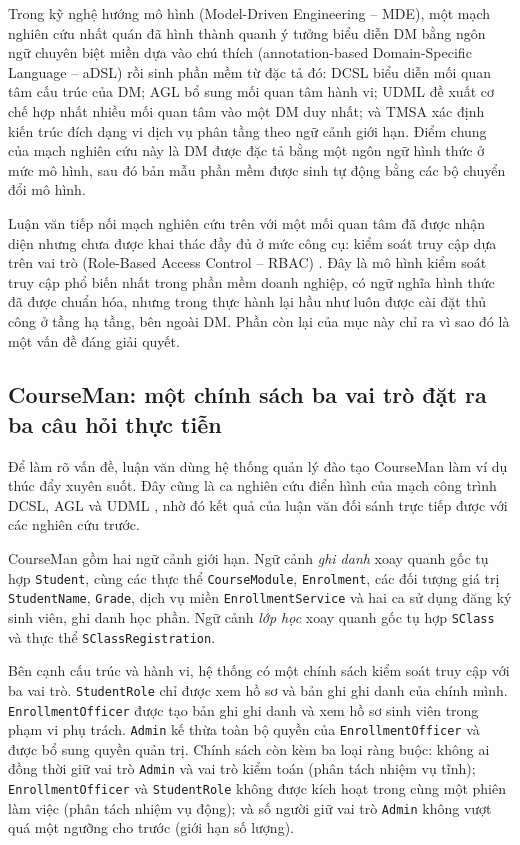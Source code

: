 Trong kỹ nghệ hướng mô hình (Model-Driven Engineering -- MDE), một mạch nghiên cứu nhất quán đã hình thành quanh ý tưởng biểu diễn DM bằng ngôn ngữ chuyên biệt miền dựa vào chú thích (annotation-based Domain-Specific Language -- aDSL) rồi sinh phần mềm từ đặc tả đó: DCSL \cite{le2018dcsl,le2020} biểu diễn mối quan tâm cấu trúc của DM; AGL \cite{dang2023agl,le2023kse} bổ sung mối quan tâm hành vi; UDML \cite{le2025udml} đề xuất cơ chế hợp nhất nhiều mối quan tâm vào một DM duy nhất; và TMSA \cite{le2025tmsa} xác định kiến trúc đích dạng vi dịch vụ phân tầng theo ngữ cảnh giới hạn. Điểm chung của mạch nghiên cứu này là DM được đặc tả bằng một ngôn ngữ hình thức ở mức mô hình, sau đó bản mẫu phần mềm được sinh tự động bằng các bộ chuyển đổi mô hình.

Luận văn tiếp nối mạch nghiên cứu trên với một mối quan tâm đã được nhận diện nhưng chưa được khai thác đầy đủ ở mức công cụ: kiểm soát truy cập dựa trên vai trò (Role-Based Access Control -- RBAC) \cite{sandhu1996}. Đây là mô hình kiểm soát truy cập phổ biến nhất trong phần mềm doanh nghiệp, có ngữ nghĩa hình thức đã được chuẩn hóa, nhưng trong thực hành lại hầu như luôn được cài đặt thủ công ở tầng hạ tầng, bên ngoài DM. Phần còn lại của mục này chỉ ra vì sao đó là một vấn đề đáng giải quyết.

\subsection{CourseMan: một chính sách ba vai trò đặt ra ba câu hỏi thực tiễn}
\label{subsec:vi-du-thuc-day}

Để làm rõ vấn đề, luận văn dùng hệ thống quản lý đào tạo CourseMan làm ví dụ thúc đẩy xuyên suốt. Đây cũng là ca nghiên cứu điển hình của mạch công trình DCSL, AGL và UDML \cite{le2018dcsl,dang2023agl,le2025udml}, nhờ đó kết quả của luận văn đối sánh trực tiếp được với các nghiên cứu trước.

CourseMan gồm hai ngữ cảnh giới hạn. Ngữ cảnh \emph{ghi danh} xoay quanh gốc tụ hợp \texttt{Student}, cùng các thực thể \texttt{CourseModule}, \texttt{Enrolment}, các đối tượng giá trị \texttt{StudentName}, \texttt{Grade}, dịch vụ miền \texttt{EnrollmentService} và hai ca sử dụng đăng ký sinh viên, ghi danh học phần. Ngữ cảnh \emph{lớp học} xoay quanh gốc tụ hợp \texttt{SClass} và thực thể \texttt{SClassRegistration}.

Bên cạnh cấu trúc và hành vi, hệ thống có một chính sách kiểm soát truy cập với ba vai trò. \texttt{StudentRole} chỉ được xem hồ sơ và bản ghi ghi danh của chính mình. \texttt{EnrollmentOfficer} được tạo bản ghi ghi danh và xem hồ sơ sinh viên trong phạm vi phụ trách. \texttt{Admin} kế thừa toàn bộ quyền của \texttt{EnrollmentOfficer} và được bổ sung quyền quản trị. Chính sách còn kèm ba loại ràng buộc: không ai đồng thời giữ vai trò \texttt{Admin} và vai trò kiểm toán (phân tách nhiệm vụ tĩnh); \texttt{EnrollmentOfficer} và \texttt{StudentRole} không được kích hoạt trong cùng một phiên làm việc (phân tách nhiệm vụ động); và số người giữ vai trò \texttt{Admin} không vượt quá một ngưỡng cho trước (giới hạn số lượng).

